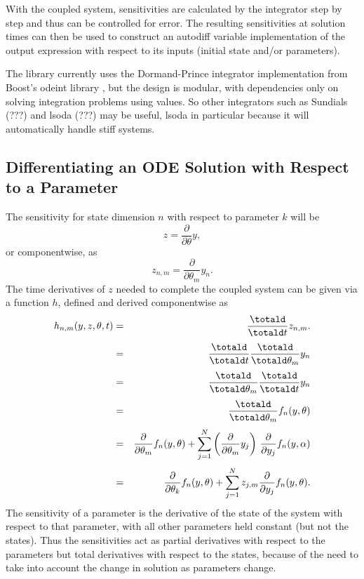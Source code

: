 \documentclass[10pt]{article}
\begin{document}
With the coupled system, sensitivities are calculated by the
integrator step by step and thus can be controlled for error.  The
resulting sensitivities at solution times can then be used to
construct an autodiff variable implementation of the output expression
with respect to its inputs (initial state and/or parameters).

The  library currently uses the Dormand-Prince
integrator implementation from Boost's odeint library
\citep{AhnertMulansky:2014}, but the design is modular, with
dependencies only on solving integration problems using 
values.   So other integrators such as Sundials (???) and lsoda (???)
may be useful, lsoda in particular because it will automatically
handle stiff systems.


\subsection{Differentiating an ODE Solution with Respect to a Parameter}

The sensitivity for state dimension $n$ with respect to parameter $k$
will be
\[
z = \frac{\partial}{\partial \theta} y,
\]
or componentwise, as
\[
z_{n,m} = \frac{\partial}{\partial \theta_m} y_n.
\]
%
The time derivatives of $z$ needed to complete the coupled system can
be given via a function $h$, defined and derived componentwise as
%
\begin{eqnarray*}
h_{n,m}(y,z,\theta,t)
& = & \frac{\totald}{\totald t} z_{n,m}.
\\[3pt]
& = &
\frac{\totald}{\totald t} \frac{\totald}{\totald \theta_m} y_n
\\[3pt]
& = &
\frac{\totald}{\totald \theta_m} \frac{\totald}{\totald t} y_n
\\[3pt]
& = & 
\frac{\totald}{\totald \theta_m} f_n(y,\theta)
\\[3pt]
& = & 
\frac{\partial}{\partial \theta_m} f_n(y,\theta)
+ \sum_{j = 1}^N \left( \frac{\partial}{\partial \theta_m} y_j \right) \, 
         \frac{\partial}{\partial y_j} f_n(y,\alpha)
\\[3pt]
& = & 
\frac{\partial}{\partial \theta_k} f_n(y,\theta)
+ \sum_{j=1}^N z_{j,m} \frac{\partial}{\partial y_j} f_n(y,\theta).
\end{eqnarray*}
%
The sensitivity of a parameter is the derivative of the state of the
system with respect to that parameter, with all other parameters held
constant (but not the states).  Thus the sensitivities act as partial
derivatives with respect to the parameters but total derivatives with
respect to the states, because of the need to take into account the
change in solution as parameters change.
\end{document}
